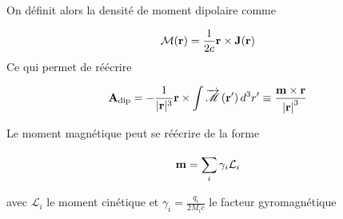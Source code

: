 On définit alors la densité de moment dipolaire comme

\[ \mathcal{M}(\vb{r}) = \frac{1}{2c} \vb{r} \times \vb{J}(\vb{r})  \]
Ce qui permet de réécrire 

\[\vb{A}_{\text{dip}} =  -\frac{1}{|\mathbf{r}|^3} \mathbf{r} \times \int \overrightarrow{\mathscr{M}}\left(\mathbf{r}^{\prime}\right) d^3 r^{\prime} \equiv \frac{\vb{m} \times \vb{r}}{\abs{\vb{r}}^{3}}  \]

Le moment magnétique peut se réécrire de la forme


\[ \vb{m} = \sum_{i}^{} \gamma_i \mathcal{L}_i \]

avec $\mathcal{L}_i$ le moment cinétique et $\gamma_i= \frac{q_i}{2M_i c} $ le facteur gyromagnétique 






